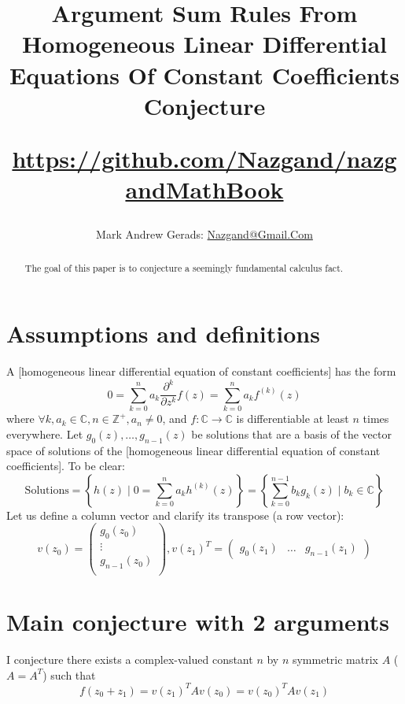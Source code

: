 \documentclass[]{article}
\author{Mark Andrew Gerads: \href{MailTo:Nazgand@Gmail.Com}{Nazgand@Gmail.Com}}
\title{
	Argument Sum Rules From Homogeneous Linear Differential Equations Of Constant Coefficients Conjecture
	
	\href{https://github.com/Nazgand/nazgandMathBook}{https://github.com/Nazgand/nazgandMathBook}
}
\newcommand{\pqty}[1]{{\left(#1\right)}}
\newcommand{\Bqty}[1]{{\left\{#1\right\}}}
\newcommand{\pdiff}[2]{\frac{\partial^{#2}}{\partial #1^{#2}}}
\numberwithin{equation}{section}
\begin{document}
	
	\maketitle
	
	\begin{abstract}
		The goal of this paper is to conjecture a seemingly fundamental calculus fact.
	\end{abstract}
	
	\section{Assumptions and definitions}
	A [homogeneous linear differential equation of constant coefficients] has the form
	\begin{equation}
		0=\sum_{k=0}^{n}a_k\pdiff{z}{k}f\pqty{z}
		=\sum_{k=0}^{n}a_k f^\pqty{k}\pqty{z}
	\end{equation}
	where $\forall k, a_k\in\mathbb{C}, n\in\mathbb{Z}^+, a_n \neq 0$, and $f:\mathbb{C}\to\mathbb{C}$ is differentiable at least $n$ times everywhere.
	Let $g_0\pqty{z},\dots,g_{n-1}\pqty{z}$ be solutions that are a basis of the vector space of solutions of the [homogeneous linear differential equation of constant coefficients]. To be clear:
	\begin{equation}
		\text{Solutions}=
		\Bqty{h\pqty{z} \mid 0=\sum_{k=0}^{n}a_k h^\pqty{k}\pqty{z}}
		=\Bqty{\sum_{k=0}^{n-1}b_k g_k\pqty{z} \mid b_k\in\mathbb{C}}
	\end{equation}
	Let us define a column vector and clarify its transpose (a row vector):
	\begin{equation}
		v\pqty{z_0}=
		\begin{pmatrix}
			g_0\pqty{z_0} \\
			\vdots \\
			g_{n-1}\pqty{z_0} \\
		\end{pmatrix}
		,
		v\pqty{z_1}^T=
		\begin{pmatrix}
			g_0\pqty{z_1} &
			\dots &
			g_{n-1}\pqty{z_1}
		\end{pmatrix}
	\end{equation}

	\section{Main conjecture with 2 arguments}
	I conjecture there exists a complex-valued constant $n$ by $n$ symmetric matrix $A$ ($A=A^T$) such that
	\begin{equation}
		f\pqty{z_0+z_1}=v\pqty{z_1}^T A v\pqty{z_0}=v\pqty{z_0}^T A v\pqty{z_1}
	\end{equation}
\end{document}
